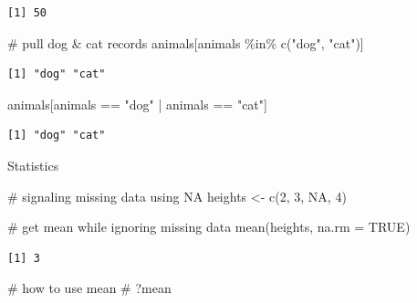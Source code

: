 \documentclass[
  letterpaper,
  DIV=11,
  numbers=noendperiod]{scrreprt}
\newenvironment{Shaded}{\begin{snugshade}}{\end{snugshade}}
\newcommand{\AttributeTok}[1]{\textcolor[rgb]{0.40,0.45,0.13}{#1}}
\newcommand{\CommentTok}[1]{\textcolor[rgb]{0.37,0.37,0.37}{#1}}
\newcommand{\ConstantTok}[1]{\textcolor[rgb]{0.56,0.35,0.01}{#1}}
\newcommand{\DecValTok}[1]{\textcolor[rgb]{0.68,0.00,0.00}{#1}}
\newcommand{\FunctionTok}[1]{\textcolor[rgb]{0.28,0.35,0.67}{#1}}
\newcommand{\NormalTok}[1]{\textcolor[rgb]{0.00,0.23,0.31}{#1}}
\newcommand{\OtherTok}[1]{\textcolor[rgb]{0.00,0.23,0.31}{#1}}
\newcommand{\SpecialCharTok}[1]{\textcolor[rgb]{0.37,0.37,0.37}{#1}}
\newcommand{\StringTok}[1]{\textcolor[rgb]{0.13,0.47,0.30}{#1}}
\begin{document}
\begin{verbatim}
[1] 50
\end{verbatim}

\begin{Shaded}
\begin{Highlighting}[]
\CommentTok{\# pull dog \& cat records}
\NormalTok{animals[animals }\SpecialCharTok{\%in\%} \FunctionTok{c}\NormalTok{(}\StringTok{"dog"}\NormalTok{, }\StringTok{"cat"}\NormalTok{)]}
\end{Highlighting}
\end{Shaded}

\begin{verbatim}
[1] "dog" "cat"
\end{verbatim}

\begin{Shaded}
\begin{Highlighting}[]
\NormalTok{animals[animals }\SpecialCharTok{==} \StringTok{"dog"} \SpecialCharTok{|}\NormalTok{ animals }\SpecialCharTok{==} \StringTok{"cat"}\NormalTok{]}
\end{Highlighting}
\end{Shaded}

\begin{verbatim}
[1] "dog" "cat"
\end{verbatim}

Statistics

\begin{Shaded}
\begin{Highlighting}[]
\CommentTok{\# signaling missing data using NA}
\NormalTok{heights }\OtherTok{\textless{}{-}} \FunctionTok{c}\NormalTok{(}\DecValTok{2}\NormalTok{, }\DecValTok{3}\NormalTok{, }\ConstantTok{NA}\NormalTok{, }\DecValTok{4}\NormalTok{)}

\CommentTok{\# get mean while ignoring missing data}
\FunctionTok{mean}\NormalTok{(heights, }\AttributeTok{na.rm =} \ConstantTok{TRUE}\NormalTok{)}
\end{Highlighting}
\end{Shaded}

\begin{verbatim}
[1] 3
\end{verbatim}

\begin{Shaded}
\begin{Highlighting}[]
\CommentTok{\# how to use mean}
\CommentTok{\# ?mean}
\end{Highlighting}
\end{Shaded}
\end{document}
